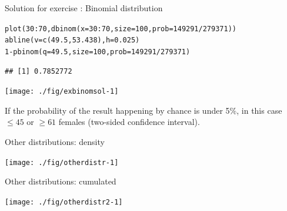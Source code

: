 \documentclass[xcolor=table,       handout,    xcolor=dvipsnames]{beamer}\usepackage[]{graphicx}\usepackage[]{color}
\makeatletter
\newcommand{\hlnum}[1]{\textcolor[rgb]{0,0,0}{#1}}
\newcommand{\hlopt}[1]{\textcolor[rgb]{0,0,0}{#1}}
\newcommand{\hlstd}[1]{\textcolor[rgb]{0,0,0}{#1}}
\newcommand{\hlkwc}[1]{\textcolor[rgb]{1,0,1}{#1}}
\newcommand{\hlkwd}[1]{\textcolor[rgb]{0,0,1}{#1}}
\newenvironment{kframe}{%
 \def\at@end@of@kframe{}%
 \ifinner\ifhmode%
  \def\at@end@of@kframe{\end{minipage}}%
  \begin{minipage}{\columnwidth}%
 \fi\fi%
 \def\FrameCommand##1{\hskip\@totalleftmargin \hskip-\fboxsep
 \colorbox{shadecolor}{##1}\hskip-\fboxsep
     \hskip-\linewidth \hskip-\@totalleftmargin \hskip\columnwidth}%
 \MakeFramed {\advance\hsize-\width
   \@totalleftmargin\z@ \linewidth\hsize
   \@setminipage}}%
 {\par\unskip\endMakeFramed%
 \at@end@of@kframe}
\newenvironment{knitrout}{}{} %
\newcounter{exercisecount}
\makeatother
\begin{document}

\begin{frame}[fragile]{Solution for exercise : Binomial distribution}
\begin{knitrout}\footnotesize
{}\color{fgcolor}\begin{kframe}
\begin{alltt}
\hlkwd{plot}\hlstd{(}\hlnum{30}\hlopt{:}\hlnum{70}\hlstd{,} \hlkwd{dbinom}\hlstd{(}\hlkwc{x}\hlstd{=}\hlnum{30}\hlopt{:}\hlnum{70}\hlstd{,} \hlkwc{size}\hlstd{=}\hlnum{100}\hlstd{,} \hlkwc{prob}\hlstd{=}\hlnum{149291}\hlopt{/}\hlnum{279371}\hlstd{))}
\hlkwd{abline}\hlstd{(}\hlkwc{v}\hlstd{=}\hlkwd{c}\hlstd{(}\hlnum{49.5}\hlstd{,} \hlnum{53.438}\hlstd{),} \hlkwc{h}\hlstd{=}\hlnum{0.025}\hlstd{)}
\hlnum{1}\hlopt{-}\hlkwd{pbinom}\hlstd{(}\hlkwc{q}\hlstd{=}\hlnum{49.5}\hlstd{,} \hlkwc{size}\hlstd{=}\hlnum{100}\hlstd{,} \hlkwc{prob}\hlstd{=}\hlnum{149291}\hlopt{/}\hlnum{279371}\hlstd{)}
\end{alltt}
\begin{verbatim}
## [1] 0.7852772
\end{verbatim}
\end{kframe}

{\centering \texttt{[image: ./fig/exbinomsol-1]} 

}



\end{knitrout}
If the probability of the result happening by chance is under 5\%, in this case $\leq 45$ or $\geq 61$  females (two-sided confidence interval).
\end{frame}

\begin{frame}[fragile]{Other distributions: density}
\begin{knitrout}
\color{fgcolor}

{\centering \texttt{[image: ./fig/otherdistr-1]} 

}



\end{knitrout}
\end{frame}


\begin{frame}[fragile]{Other distributions: cumulated}
\begin{knitrout}
\color{fgcolor}

{\centering \texttt{[image: ./fig/otherdistr2-1]} 

}



\end{knitrout}
\end{frame}
\end{document}
